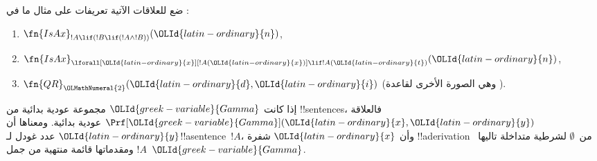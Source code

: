 \documentclass[../../../include/open-logic-section]{subfiles}
\begin{document}
\begin{prob}
ضع للعلاقات الآتية تعريفات على مثال ما في
:
\begin{enumerate}
\item $\fn{IsAx}_{!A \lif (!B \lif (!A \land !B))}({\OLId{latin-ordinary}{n}})$,
\item $\fn{IsAx}_{\lforall[{\OLId{latin-ordinary}{x}}][!A({\OLId{latin-ordinary}{x}})] \lif !A({\OLId{latin-ordinary}{t}})}({\OLId{latin-ordinary}{n}})$,
\item $\fn{QR}_{{\OLMathNumeral{2}}}({\OLId{latin-ordinary}{d}}, {\OLId{latin-ordinary}{i}})$ (وهي الصورة الأخرى لقاعدة \QR).
\end{enumerate}
\end{prob}

\begin{prop}
إذا كانت ${\OLId{greek-variable}{Gamma}}$ مجموعة عودية بدائية من !!{sentence}s، فالعلاقة
$\Prf[{\OLId{greek-variable}{Gamma}}]({\OLId{latin-ordinary}{x}},{\OLId{latin-ordinary}{y}})$ عودية بدائية. ومعناها أن ${\OLId{latin-ordinary}{y}}$ عدد غودل
لـ!!a{sentence}~$!A$، وأن ${\OLId{latin-ordinary}{x}}$ شفرة !!a{derivation} من~$\emptyset$
لشرطية متداخلة تاليها~$!A$ ومقدماتها قائمة منتهية من جمل~${\OLId{greek-variable}{Gamma}}$.
\end{prop}
\end{document}
